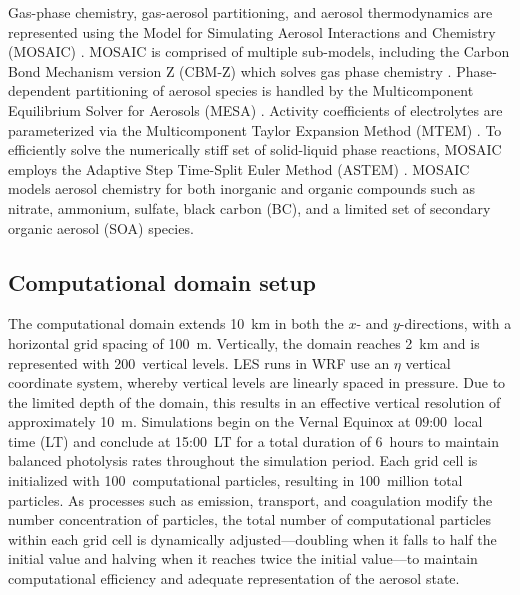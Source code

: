 \documentclass[journal abbreviation, manuscript]{copernicus}
\begin{document}
Gas-phase chemistry, gas-aerosol partitioning, and aerosol
thermodynamics are represented using the Model for Simulating Aerosol
Interactions and Chemistry (MOSAIC) \citep{zaveri_model_2008}. MOSAIC
is comprised of multiple sub-models, including the Carbon Bond
Mechanism version Z (CBM-Z) which solves gas phase chemistry
\citep{zaveri_new_1999}. Phase-dependent partitioning of aerosol
species is handled by the Multicomponent Equilibrium Solver for
Aerosols (MESA) \citep{zaveri_computationally_2005}. Activity
coefficients of electrolytes are parameterized via the Multicomponent
Taylor Expansion Method (MTEM) \citep{zaveri_new_2005}. To efficiently
solve the numerically stiff set of solid-liquid phase reactions,
MOSAIC employs the Adaptive Step Time-Split Euler Method (ASTEM)
\citep{zaveri_model_2008}. MOSAIC models aerosol chemistry for both
inorganic and organic compounds such as nitrate, ammonium, sulfate,
black carbon (BC), and a limited set of secondary organic aerosol
(SOA) species.

\subsection{Computational domain setup}

The computational domain extends 10~km in both the $x$- and
$y$-directions, with a horizontal grid spacing of 100~m.  Vertically,
the domain reaches 2~km and is represented with 200~vertical
levels. LES runs in WRF use an $\eta$ vertical coordinate system,
whereby vertical levels are linearly spaced in pressure. Due to the
limited depth of the domain, this results in an effective vertical
resolution of approximately 10~m. Simulations begin on the Vernal
Equinox at 09:00~local time (LT) and conclude at 15:00~LT for a total
duration of 6~hours to maintain balanced photolysis rates throughout
the simulation period. Each grid cell is initialized with
100~computational particles, resulting in 100~million total
particles. As processes such as emission, transport, and coagulation
modify the number concentration of particles, the total number of
computational particles within each grid cell is dynamically
adjusted---doubling when it falls to half the initial value and
halving when it reaches twice the initial value---to maintain
computational efficiency and adequate representation of the aerosol
state. 
\end{document}
